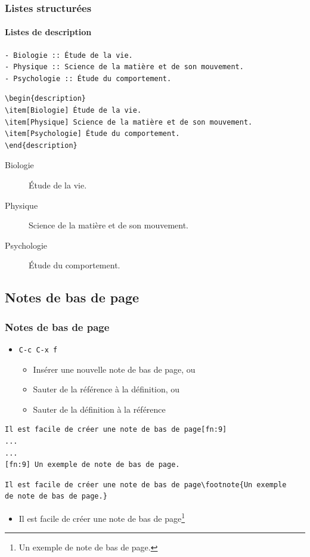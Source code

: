 \documentclass[presentation,t,hideothersubsections]{beamer}
\begin{document}
\begin{frame}[fragile]
\frametitle{Listes structurées}
\framesubtitle{Listes de description}
\label{sec-2-6-5}



\lstset{language=org}
\begin{lstlisting}
- Biologie :: Étude de la vie.
- Physique :: Science de la matière et de son mouvement.
- Psychologie :: Étude du comportement.
\end{lstlisting}


\lstset{language=TeX}
\begin{lstlisting}
\begin{description}
\item[Biologie] Étude de la vie.
\item[Physique] Science de la matière et de son mouvement.
\item[Psychologie] Étude du comportement.
\end{description}
\end{lstlisting}

\begin{description}
\item[Biologie] Étude de la vie.
\item[Physique] Science de la matière et de son mouvement.
\item[Psychologie] Étude du comportement.
\end{description}
\end{frame}
\subsection{Notes de bas de page}
\label{sec-2-7}
\begin{frame}[fragile]
\frametitle{Notes de bas de page}
\label{sec-2-7-1}


\begin{itemize}
\item \texttt{C-c C-x f}
\begin{itemize}
\item Insérer une nouvelle note de bas de page, ou
\item Sauter de la référence à la définition, ou
\item Sauter de la définition à la référence
\end{itemize}
\end{itemize}


\lstset{language=org}
\begin{lstlisting}
Il est facile de créer une note de bas de page[fn:9]
...
...
[fn:9] Un exemple de note de bas de page.
\end{lstlisting}


\lstset{language=TeX}
\begin{lstlisting}
Il est facile de créer une note de bas de page\footnote{Un exemple
de note de bas de page.}
\end{lstlisting}

\begin{itemize}
\item Il est facile de créer une note de bas de page\footnote{Un exemple de note de bas de page.
 }
\end{itemize}
\end{frame}
\end{document}
